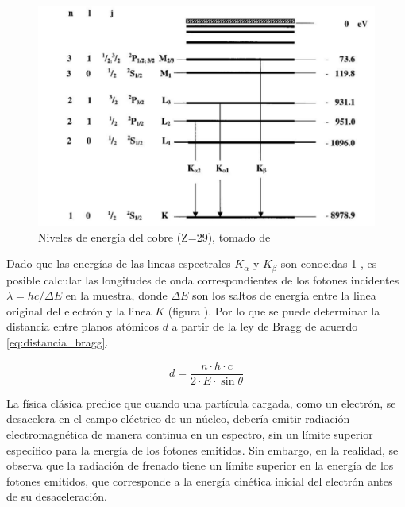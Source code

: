 \begin{figure}[H]
	\centering
	\begin{minipage}{0.55\textwidth} 
		\includegraphics[width=\textwidth]{grafico_2x05_cupper_levels.png}
		\caption{\footnotesize Niveles de energía del cobre (Z=29), tomado de \cite{Haynes2016}}
		\label{fig:culevels}
	\end{minipage}
\end{figure} 



Dado que las energías de las lineas espectrales $K_{\alpha}$ y $K_{\beta}$ son conocidas \ref{fig:culevels} , es posible calcular las longitudes de onda correspondientes de los fotones incidentes $\lambda = hc/\Delta E$ en la muestra, donde $\Delta E$ son los saltos de energía entre la linea original del electrón y la linea $K$ (figura ). Por lo que se puede determinar la distancia entre planos atómicos $d$ a partir de la ley de Bragg de acuerdo \ref{eq:distancia_bragg}.

\vspace{\baselineskip}
\begin{equation} \label{eq:distancia_bragg}
	d = \frac{n\cdot h \cdot c}{2\cdot E\cdot\sin\theta}
\end{equation} 


\vspace{\baselineskip}
La física clásica predice que cuando una partícula cargada, como un electrón, se desacelera en el campo eléctrico de un núcleo, debería emitir radiación electromagnética de manera continua en un espectro, sin un límite superior específico para la energía de los fotones emitidos. Sin embargo, en la realidad, se observa que la radiación de frenado tiene un límite superior en la energía de los fotones emitidos, que corresponde a la energía cinética inicial del electrón antes de su desaceleración.

